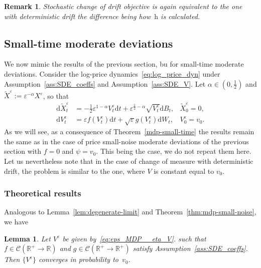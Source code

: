 \documentclass{amsart}[11pt]
\numberwithin{equation}{section}
\numberwithin{theorem}{subsection}
\numberwithin{proposition}{subsection}
\numberwithin{definition}{subsection}
\newtheorem{lemma}{Lemma}
\numberwithin{lemma}{subsection}
\newtheorem*{remark}{Remark}
\numberwithin{assumption}{subsection}
\newcommand{\Cc}{\mathcal{C}}
\newcommand{\RR}{\mathbb{R}}
\newcommand{\D}{\mathrm{d}}
\newcommand{\eps}{\varepsilon}
\newcommand{\hh}{\boldsymbol{\mathrm{h}}}
\begin{document}
\begin{remark}
Stochastic change of drift objective is again equivalent to the one with deterministic drift the difference 
being how~$\hh$ is calculated.
\end{remark}

\subsection{Small-time moderate deviations}
We now mimic the results of the previous section, bu for small-time moderate deviations. 
Consider the log-price dynamics~\eqref{eq:log_price_dyn} under  Assumption~\ref{ass:SDE_coeffs} and Assumption~\ref{ass:SDE_V}.
Let $\alpha \in (0,\frac{1}{2})$ and 
${\widetilde{X}^\eps := \eps^{-\alpha} X^{\eps}}$, so that
\begin{equation*}
\begin{array}{rll}
\D\widetilde{X}^\eps_t
&= \displaystyle -\frac{1}{2}\eps^{1-\alpha} V_t^{\eps} \D t + \eps^{\frac{1}{2}-\alpha}\sqrt{V_t^\eps}\D B_t, 
& \widetilde{X}_0^\eps = 0, \\
\D V_t^\eps &= \displaystyle\eps f(V_t^\eps)\D t + \sqrt{\eps}g(V_t^\eps)\D W_t,  & V_0^\eps = v_0.
\end{array}
\end{equation*}
As we will see, as a consequence of Theorem~\ref{mdp-small-time} the results remain the same as in the case of price small-noise moderate deviations of the previous section with $f = 0$ and $\psi = v_0$. This being the case, we do not repeat them here. Let us nevertheless note that in the case of change of measure with deterministic drift, the problem is similar to the one, where $V$ is constant equal to $v_0$.
\subsubsection{Theoretical results}

Analogous to Lemma~\ref{lem:degenerate-limit} and Theorem~\ref{thm:mdp-small-noise}, we have 
\begin{lemma} \label{lem:degenerate-limit-small}
Let $V^{\eps}$ be given by~\eqref{eq:eps_MDP__eta_V}.
such that $f\in\Cc(\RR^+\to \RR)$ and $g\in\Cc(\RR^+\to \RR^+)$ satisfy Assumption~\ref{ass:SDE_coeffs}. 
Then $\{V^{\eps}\}$ converges in probability to~$v_0$.
\end{lemma}
\end{document}
